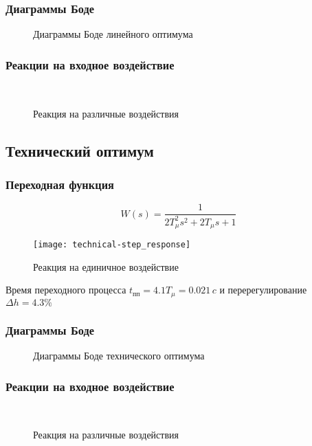 			\subsubsection{Диаграммы Боде}
				\begin{figure}[H]
					\centering
					\caption{Диаграммы Боде линейного оптимума}
				\end{figure}
			\subsubsection{Реакции на входное воздействие}
				\begin{figure}[H]
					\centering
					\\
					\centering{}
					\caption{Реакция на различные воздействия}
				\end{figure}
		\newpage
		\subsection{Технический оптимум}
			\subsubsection{Переходная функция}
				$$W(s)=\frac{1}{2T_\mu^2 s^2+2T_\mu s+1}$$
				\begin{figure}[H]
					\centering
					\texttt{[image: technical-step\_response]}
					\caption{Реакция на единичное воздействие}
				\end{figure}
				Время переходного процесса $t_{\text{пп}}=4.1T_{\mu}=0.021\,c$ и перерегулирование $\Delta h=4.3\%$
			\subsubsection{Диаграммы Боде}
				\begin{figure}[H]
					\centering
					\caption{Диаграммы Боде технического оптимума}
				\end{figure}
			\subsubsection{Реакции на входное воздействие}
				\begin{figure}[H]
					\centering
					\\
					\centering{}
					\caption{Реакция на различные воздействия}
				\end{figure}
		\newpage
